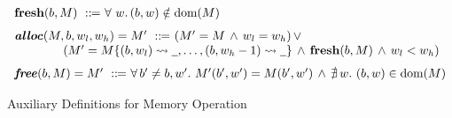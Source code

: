 \begin{figure}[!t]
    \centering
    \small
    \[
        \begin{array}{l}
            \fresh(\block, \Mem) \ \define \ \forall \ \word. \, (\block, \word) \notin \dom(\Mem)
            \\
            \\[-5pt]
            \malloc(\Mem, \block, \word_l, \word_h) = \Mem' \ \define \ 
            (\Mem' = \Mem \, \land \, \word_l = \word_h) \, \lor \, 
            \\
            \qquad\qquad
            (\Mem' = \Mem 
                        \{ (\block, \word_l) \rightsquigarrow \notCare, \dots, 
                            (\block, \word_h - 1) \rightsquigarrow \notCare \}
            \, \land \, \fresh(\block, \Mem) \, \land \, 
            \word_l < \word_h) 
            \\
            \\[-5pt]
            \mfree(\block, \Mem) = \Mem' \ \define \ 
            \forall \, \block' \neq \block, \word'. \ 
            \Mem'(\block', \word') = \Mem(\block', \word') \, \land \, 
            \nexists \, \word. \ (\block, \word) \in \dom(\Mem)
        \end{array}
    \]
    \caption{Auxiliary Definitions for Memory Operation}
    \label{fig:Auxiliary Definitions for Memory Operation}
    \vspace{-0.5em}
\end{figure}


